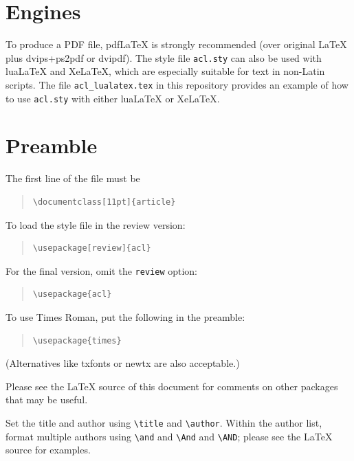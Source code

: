 \documentclass[11pt]{article}
\begin{document}
\iffalse
\section{Engines}

To produce a PDF file, pdf\LaTeX{} is strongly recommended (over original \LaTeX{} plus dvips+ps2pdf or dvipdf).
The style file \texttt{acl.sty} can also be used with
lua\LaTeX{} and
Xe\LaTeX{}, which are especially suitable for text in non-Latin scripts.
The file \texttt{acl\_lualatex.tex} in this repository provides
an example of how to use \texttt{acl.sty} with either
lua\LaTeX{} or
Xe\LaTeX{}.

\section{Preamble}

The first line of the file must be
\begin{quote}
\begin{verbatim}
\documentclass[11pt]{article}
\end{verbatim}
\end{quote}

To load the style file in the review version:
\begin{quote}
\begin{verbatim}
\usepackage[review]{acl}
\end{verbatim}
\end{quote}
For the final version, omit the \verb|review| option:
\begin{quote}
\begin{verbatim}
\usepackage{acl}
\end{verbatim}
\end{quote}

To use Times Roman, put the following in the preamble:
\begin{quote}
\begin{verbatim}
\usepackage{times}
\end{verbatim}
\end{quote}
(Alternatives like txfonts or newtx are also acceptable.)

Please see the \LaTeX{} source of this document for comments on other packages that may be useful.

Set the title and author using \verb|\title| and \verb|\author|. Within the author list, format multiple authors using \verb|\and| and \verb|\And| and \verb|\AND|; please see the \LaTeX{} source for examples.
\end{document}
